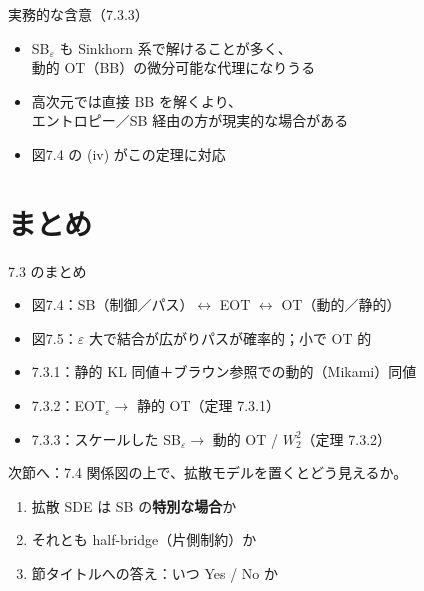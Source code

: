 \asmain
\begin{frame}{実務的な含意（7.3.3）}
    \begin{itemize}
        \item SB$_\varepsilon$ も Sinkhorn 系で解けることが多く、\\
        動的 OT（BB）の微分可能な代理になりうる
        \item 高次元では直接 BB を解くより、\\
        エントロピー／SB 経由の方が現実的な場合がある
        \item 図7.4 の (iv) がこの定理に対応
    \end{itemize}
\end{frame}
\section{まとめ}
\asmain
\begin{frame}{7.3 のまとめ}
    \begin{itemize}
        \item 図7.4：SB（制御／パス）$\leftrightarrow$ EOT $\leftrightarrow$ OT（動的／静的）
        \item 図7.5：$\varepsilon$ 大で結合が広がりパスが確率的；小で OT 的
        \item 7.3.1：静的 KL 同値＋ブラウン参照での動的（Mikami）同値
        \item 7.3.2：EOT$_\varepsilon\to$ 静的 OT（定理 7.3.1）
        \item 7.3.3：スケールした SB$_\varepsilon\to$ 動的 OT / $W_2^2$（定理 7.3.2）
    \end{itemize}
\end{frame}
\asmain
\begin{frame}{次節へ：7.4}
    関係図の上で、拡散モデルを置くとどう見えるか。
    \begin{enumerate}
        \item 拡散 SDE は SB の\textbf{特別な場合}か
        \item それとも half-bridge（片側制約）か
        \item 節タイトルへの答え：いつ Yes / No か
    \end{enumerate}
\end{frame}
